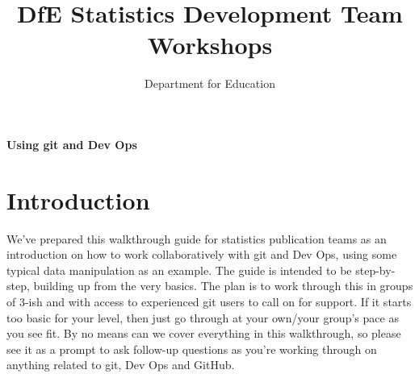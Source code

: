 \documentclass[
  12pt,
]{article}
\title{DfE Statistics Development Team Workshops}
\author{Department for Education}
\date{}
\begin{document}
\maketitle


\vspace*{0.24\textheight}

\raggedright{} 

\huge{\color{dfeheadingblue}\textbf{Using git and Dev Ops}}
\vspace*{2\baselineskip} 

\normalsize 
 \newpage 


{
\hypersetup{linkcolor=}
\setcounter{tocdepth}{2}
\tableofcontents
}
\newpage

\hypertarget{introduction}{%
\section{Introduction}\label{introduction}}

We've prepared this walkthrough guide for statistics publication teams
as an introduction on how to work collaboratively with git and Dev Ops,
using some typical data manipulation as an example. The guide is
intended to be step-by-step, building up from the very basics. The plan
is to work through this in groups of 3-ish and with access to
experienced git users to call on for support. If it starts too basic for
your level, then just go through at your own/your group's pace as you
see fit. By no means can we cover everything in this walkthrough, so
please see it as a prompt to ask follow-up questions as you're working
through on anything related to git, Dev Ops and GitHub.
\end{document}
